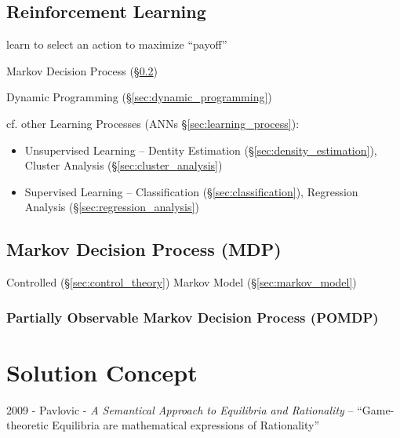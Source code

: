 \subsection{Reinforcement Learning}\label{sec:reinforcement_learning}

learn to select an action to maximize ``payoff''

Markov Decision Process (\S\ref{sec:mdp})

Dynamic Programming (\S\ref{sec:dynamic_programming})

cf. other Learning Processes (ANNs \S\ref{sec:learning_process}):
\begin{itemize}
  \item Unsupervised Learning -- Dentity Estimation
    (\S\ref{sec:density_estimation}), Cluster Analysis
    (\S\ref{sec:cluster_analysis})
  \item Supervised Learning -- Classification (\S\ref{sec:classification}),
    Regression Analysis (\S\ref{sec:regression_analysis})
\end{itemize}



\subsection{Markov Decision Process (MDP)}\label{sec:mdp}

Controlled (\S\ref{sec:control_theory}) Markov Model (\S\ref{sec:markov_model})



\subsubsection{Partially Observable Markov Decision Process (POMDP)}
\label{sec:pomdp}



\section{Solution Concept}\label{sec:solution_concept}

2009 - Pavlovic - \emph{A Semantical Approach to Equilibria and Rationality} --
``Game-theoretic Equilibria are mathematical expressions of Rationality''



